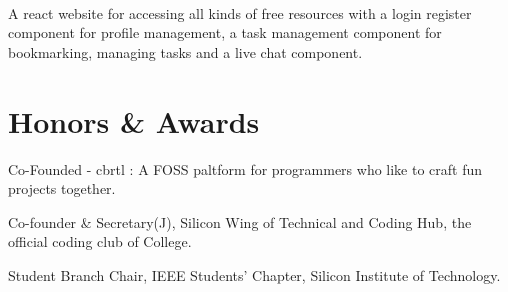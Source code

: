 \documentclass[]{deedy-resume-openfont}
\begin{document}
    \hfill {}\\
    A react website for accessing all kinds of free resources with a login register component for profile management, a task management component for bookmarking, managing tasks and a live chat component.\\
    \sectionsep
%
%
\section{Honors \& Awards}
\begin{tightemize}
\item Co-Founded - cbrtl : A FOSS paltform for programmers who like to craft fun projects together.\\
\item Co-founder \& Secretary(J), Silicon Wing of Technical and Coding Hub, the official coding club of College.\\
\item Student Branch Chair, IEEE Students’ Chapter, Silicon Institute of Technology.\\
\end{tightemize}
     \ 
     
\end{document}

